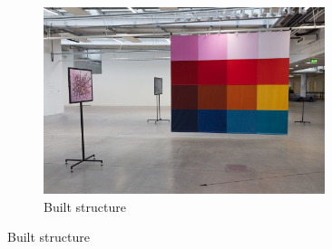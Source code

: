 \documentclass{article}
\begin{document}
\begin{figure}[ht!]
\begin{subfigure}[t]{0.45\textwidth}
    \includegraphics[width=0.9\textwidth]{images/results/strokes.jpg}
    \caption{Built structure}
  \end{subfigure}
\end{figure}
\end{document}
